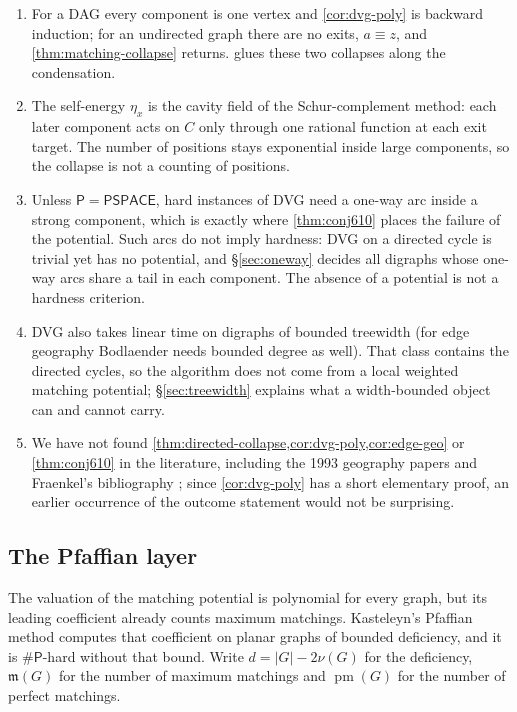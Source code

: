 \documentclass[final]{siamart0516}
\numberwithin{theorem}{section}
\numberwithin{equation}{section}
\theoremstyle{siamnonum}
\renewenvironment{remark*}{\remarkstar}{\endremarkstar}
\theoremstyle{plain}
\newcommand{\mm}{\mathfrak{m}}            %
\newcommand{\cls}[1]{\mathsf{#1}}
\newcommand{\PSPACE}{\cls{PSPACE}}
\newcommand{\Pclass}{\cls{P}}
\newcommand{\sharpP}{\#\cls{P}}
\begin{document}
\begin{remark*}
\begin{enumerate}[label=(\arabic*)]
\item For a DAG every component is one vertex and \cref{cor:dvg-poly} is backward induction; for an undirected graph there are no exits, $a\equiv z$, and \cref{thm:matching-collapse} returns.  glues these two collapses along the condensation.
\item The self-energy $\eta_x$ is the cavity field of the Schur-complement method: each later component acts on $C$ only through one rational function at each exit target. The number of positions stays exponential inside large components, so the collapse is not a counting of positions.
\item Unless $\Pclass=\PSPACE$, hard instances of DVG need a one-way arc inside a strong component, which is exactly where \cref{thm:conj610} places the failure of the potential. Such arcs do not imply hardness: DVG on a directed cycle is trivial yet has no potential, and \S\ref{sec:oneway} decides all digraphs whose one-way arcs share a tail in each component. The absence of a potential is not a hardness criterion.
\item DVG also takes linear time on digraphs of bounded treewidth \cite{Bodlaender} (for edge geography Bodlaender needs bounded degree as well). That class contains the directed cycles, so the algorithm does not come from a local weighted matching potential; \S\ref{sec:treewidth} explains what a width-bounded object can and cannot carry.
\item We have not found \cref{thm:directed-collapse,cor:dvg-poly,cor:edge-geo} or \cref{thm:conj610} in the literature, including the 1993 geography papers \cite{Bodlaender,FraenkelSimonson,FSU} and Fraenkel's bibliography \cite{FraenkelBib}; since \cref{cor:dvg-poly} has a short elementary proof, an earlier occurrence of the outcome statement would not be surprising.
\end{enumerate}
\end{remark*}

\subsection{The Pfaffian layer}\label{ssec:pfaffian}
The valuation of the matching potential is polynomial for every graph, but its leading coefficient already counts maximum matchings. Kasteleyn's Pfaffian method computes that coefficient on planar graphs of bounded deficiency, and it is $\sharpP$-hard without that bound. Write $d=|G|-2\nu(G)$ for the deficiency, $\mm(G)$ for the number of maximum matchings and $\operatorname{pm}(G)$ for the number of perfect matchings.
\end{document}
